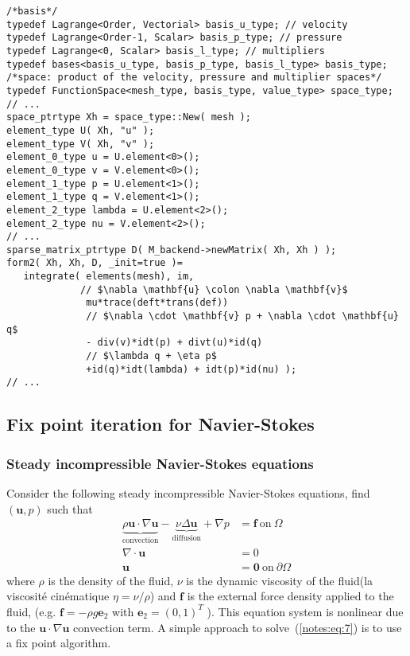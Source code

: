   \begin{lstlisting}
/*basis*/
typedef Lagrange<Order, Vectorial> basis_u_type; // velocity
typedef Lagrange<Order-1, Scalar> basis_p_type; // pressure
typedef Lagrange<0, Scalar> basis_l_type; // multipliers
typedef bases<basis_u_type, basis_p_type, basis_l_type> basis_type;
/*space: product of the velocity, pressure and multiplier spaces*/
typedef FunctionSpace<mesh_type, basis_type, value_type> space_type;
// ...
space_ptrtype Xh = space_type::New( mesh );
element_type U( Xh, "u" );
element_type V( Xh, "v" );
element_0_type u = U.element<0>();
element_0_type v = V.element<0>();
element_1_type p = U.element<1>();
element_1_type q = V.element<1>();
element_2_type lambda = U.element<2>();
element_2_type nu = V.element<2>();
// ...
sparse_matrix_ptrtype D( M_backend->newMatrix( Xh, Xh ) );
form2( Xh, Xh, D, _init=true )=
   integrate( elements(mesh), im,
             // $\nabla \mathbf{u} \colon \nabla \mathbf{v}$
              mu*trace(deft*trans(def))
              // $\nabla \cdot \mathbf{v} p + \nabla \cdot \mathbf{u} q$
              - div(v)*idt(p) + divt(u)*id(q)
              // $\lambda q + \eta p$
              +id(q)*idt(lambda) + idt(p)*id(nu) );
// ...
  \end{lstlisting}


\subsection{Fix point iteration for Navier-Stokes}
\label{sec:fix-point-iteration}

\subsubsection{Steady incompressible Navier-Stokes equations}
  Consider the following steady incompressible Navier-Stokes
  equations, find $(\mathbf{u},p)$ such that
  \begin{equation}
    \label{notes:eq:7}
    \begin{split}
      \underbrace{\rho \mathbf{u} \cdot \nabla \mathbf{u}}_{\text{convection}} - \underbrace{\nu \Delta  \mathbf{u}}_{\text{diffusion}} + \nabla p &=  \mathbf{f} \ \text{on}\ \Omega \\
      \nabla \cdot \mathbf{u} &= 0 \\
      \mathbf{u} &= \mathbf{0}\ \text{on}\ \partial \Omega
    \end{split}
  \end{equation}
  where $\rho$ is the density of the fluid, $\nu$ is the dynamic
  viscosity of the fluid(la viscosité cinématique $\eta = \nu/\rho$) and $\mathbf{f}$ is the external force
  density applied to the fluid, (e.g. $\mathbf{f}=-\rho g \mathbf{e}_2$ with $\mathbf{e}_2=(0,1)^T$ ).  This equation system is nonlinear due
  to the $\mathbf{u} \cdot \nabla \mathbf{u}$ convection term. A
  simple approach to solve~(\ref{notes:eq:7}) is to use a fix point
  algorithm.


